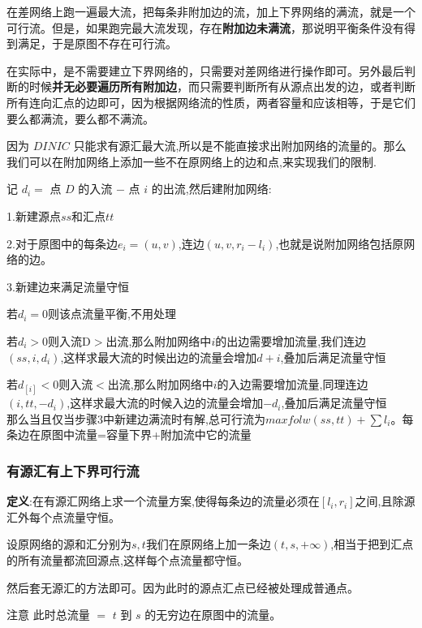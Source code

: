 \documentclass[12pt, a4paper, oneside]{ctexart}
\begin{document}
\qquad 在差网络上跑一遍最大流，把每条非附加边的流，加上下界网络的满流，就是一个可行流。但是，如果跑完最大流发现，存在\textbf{附加边未满流}，那说明平衡条件没有得到满足，于是原图不存在可行流。\par

\qquad 在实际中，是不需要建立下界网络的，只需要对差网络进行操作即可。另外最后判断的时候\textbf{并无必要遍历所有附加边}，而只需要判断所有从源点出发的边，或者判断所有连向汇点的边即可，因为根据网络流的性质，两者容量和应该相等，于是它们要么都满流，要么都不满流。\par

\qquad 因为 $DINIC$ 只能求有源汇最大流,所以是不能直接求出附加网络的流量的。那么我们可以在附加网络上添加一些不在原网络上的边和点,来实现我们的限制.\par
记 $d_{i}=$ 点 $D$ 的入流 $-$ 点 $i$ 的出流,然后建附加网络:\par
1.新建源点$ss$和汇点$tt$\par
2.对于原图中的每条边$e_{i}=(u,v)$,连边$(u,v,r_{i}-l_{i})$,也就是说附加网络包括原网络的边。\par
3.新建边来满足流量守恒\par
若$d_{i}=0$则该点流量平衡,不用处理\par
若$d_{i}>0$则入流D$>$出流,那么附加网络中$i$的出边需要增加流量,我们连边$(ss,i,d_{i})$,这样求最大流的时候出边的流量会增加$d+{i}$,叠加后满足流量守恒\par
若$d_[i]<0$则入流$<$出流,那么附加网络中$i$的入边需要增加流量,同理连边$(i,tt,-d_{i})$,这样求最大流的时候入边的流量会增加$-d_{i}$,叠加后满足流量守恒\\
那么当且仅当步骤3中新建边满流时有解,总可行流为$maxfolw(ss,tt)+\sum{l_{i}}$。每条边在原图中流量=容量下界+附加流中它的流量

\subsubsection{有源汇有上下界可行流}
\textbf{定义}:在有源汇网络上求一个流量方案,使得每条边的流量必须在$[l_{i},r_{i}]$之间,且除源汇外每个点流量守恒。\par
设原网络的源和汇分别为$s,t$我们在原网络上加一条边${(t,s,+\infty)}$,相当于把到汇点的所有流量都流回源点,这样每个点流量都守恒。\par
\qquad 然后套无源汇的方法即可。因为此时的源点汇点已经被处理成普通点。\par
\qquad 注意 此时总流量 $=$  $t$ 到 $s$ 的无穷边在原图中的流量。
\end{document}
